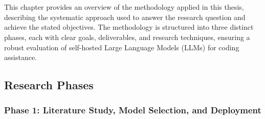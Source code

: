 \chapter{}%
\label{ch:methodologie}


This chapter provides an overview of the methodology applied in this thesis, describing the systematic approach used to answer the research question and achieve the stated objectives. The methodology is structured into three distinct phases, each with clear goals, deliverables, and research techniques, ensuring a robust evaluation of self-hosted Large Language Models (LLMs) for coding assistance.
\section{Research Phases}
\label{sec:research-phases}

\subsection{Phase 1: Literature Study, Model Selection, and Deployment}

